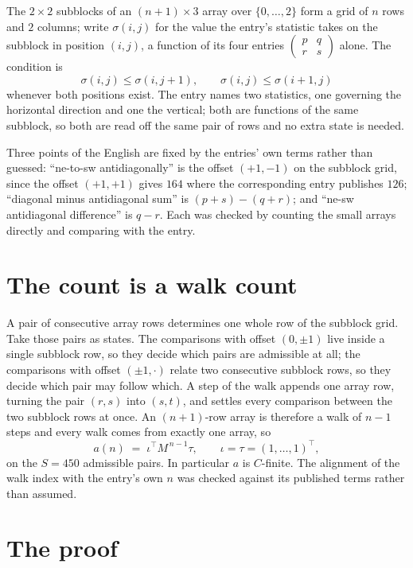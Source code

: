 \documentclass[11pt,a4paper]{article}
\theoremstyle{plain}
\theoremstyle{definition}
\begin{document}
The $2\times2$ subblocks of an $(n+1)\times3$ array over $\{0,\dots,2\}$ form a grid
of $n$ rows and $2$ columns; write $\sigma(i,j)$ for the value the entry's statistic takes on
the subblock in position $(i,j)$, a function of its four entries
$\begin{pmatrix}p&q\\r&s\end{pmatrix}$ alone. The condition is
\[
\sigma(i,j)\le\sigma(i,j+1),\qquad \sigma(i,j)\le\sigma(i+1,j)
\]
whenever both positions exist. The entry names two statistics, one governing the horizontal direction and one the vertical; both are functions of the same subblock, so both are read off the same pair of rows and no extra state is needed.

Three points of the English are fixed by the entries' own terms rather than guessed:
``ne-to-sw antidiagonally'' is the offset $(+1,-1)$ on the subblock grid, since the offset
$(+1,+1)$ gives $164$ where the corresponding entry publishes $126$; ``diagonal minus
antidiagonal sum'' is $(p+s)-(q+r)$; and ``ne-sw antidiagonal difference'' is $q-r$. Each was
checked by counting the small arrays directly and comparing with the entry.

\section{The count is a walk count}

A pair of consecutive array rows determines one whole row of the subblock grid. Take those
pairs as states. The comparisons with offset $(0,\pm1)$ live inside a single subblock row, so
they decide which pairs are admissible at all; the comparisons with offset $(\pm1,\cdot)$
relate two consecutive subblock rows, so they decide which pair may follow which. A step of the
walk appends one array row, turning the pair $(r,s)$ into $(s,t)$, and settles every comparison
between the two subblock rows at once. An $(n+1)$-row array is therefore a walk of $n-1$ steps
and every walk comes from exactly one array, so
\[
a(n)\;=\;\iota^{\!\top}M^{\,n-1}\tau,\qquad \iota=\tau=(1,\dots,1)^{\!\top},
\]
on the $S=450$ admissible pairs. In particular $a$ is $C$-finite. The alignment of the walk
index with the entry's own $n$ was checked against its published terms rather than assumed.

\section{The proof}
\end{document}
